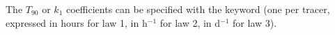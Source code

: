 
The $T_{90}$ or $k_1$ coefficients can be specified
with the keyword 
(one per tracer, expressed in hours for law 1, in h$^{-1}$ for law 2,
in d$^{-1}$ for law 3).
